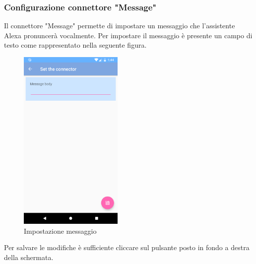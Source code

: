 \subsubsection{Configurazione connettore "Message"}
Il connettore "Message" permette di impostare un messaggio che l'assistente Alexa pronuncerà vocalmente. Per impostare il messaggio è presente un campo di testo come rappresentato nella seguente figura.
\begin{figure}[H]
	\centering
	\includegraphics[width=5cm]{../includes/pics/configurazione_message-body.png}
	\caption{\label{fig:configurazione_message}Impostazione messaggio}
\end{figure}
Per salvare le modifiche è sufficiente cliccare sul pulsante posto in fondo a destra della schermata.

